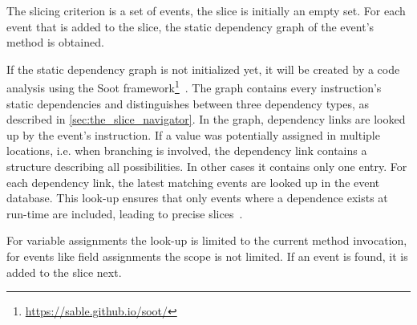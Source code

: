 \documentclass[
			english,
			review,
			]{elsarticle}
\begin{document}


The slicing criterion is a set of events, the slice is initially an empty set.
For each event that is added to the slice, the static dependency graph of the event's method is obtained.

If the static dependency graph is not initialized yet, it will be created by a code analysis using the Soot framework\footnote{\url{https://sable.github.io/soot/}}~\cite{lam_11_the_soot_framework}.
The graph contains every instruction's static dependencies and distinguishes between three dependency types, as described in \cref{sec:the_slice_navigator}.
In the graph, dependency links are looked up by the event's instruction. 
If a value was potentially assigned in multiple locations, i.e. when branching is involved, the dependency link contains a structure describing all possibilities.
In other cases it contains only one entry.
For each dependency link, the latest matching events are looked up in the event database.
This look-up ensures that only events where a dependence exists at run-time are included, leading to precise slices~\cite{zhang_precise_2003}.

For variable assignments the look-up is limited to the current method invocation, for events like field assignments the scope is not limited.
If an event is found, it is added to the slice next.
\end{document}
